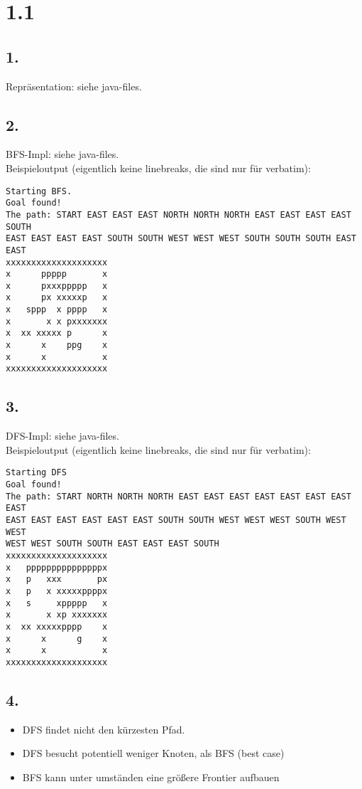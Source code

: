 \documentclass[a4paper,11pt,fleqn]{scrartcl}
\title{\titleinfo}
\author{\authorinfo}
\begin{document}
\maketitle

\section*{1.1}
\subsection*{1.}
Repräsentation: siehe java-files.
\subsection*{2.}
BFS-Impl: siehe java-files. \\
Beispieloutput (eigentlich keine linebreaks, die sind nur für verbatim):
\begin{verbatim}
Starting BFS.
Goal found!
The path: START EAST EAST EAST NORTH NORTH NORTH EAST EAST EAST EAST SOUTH 
EAST EAST EAST EAST SOUTH SOUTH WEST WEST WEST SOUTH SOUTH SOUTH EAST EAST
xxxxxxxxxxxxxxxxxxxx
x      ppppp       x
x      pxxxppppp   x
x      px xxxxxp   x
x   sppp  x pppp   x
x       x x pxxxxxxx
x  xx xxxxx p      x
x      x    ppg    x
x      x           x
xxxxxxxxxxxxxxxxxxxx
\end{verbatim}

\newpage

\subsection*{3.}
DFS-Impl: siehe java-files. \\
Beispieloutput (eigentlich keine linebreaks, die sind nur für verbatim):
\begin{verbatim}
Starting DFS
Goal found!
The path: START NORTH NORTH NORTH EAST EAST EAST EAST EAST EAST EAST EAST 
EAST EAST EAST EAST EAST EAST SOUTH SOUTH WEST WEST WEST SOUTH WEST WEST 
WEST WEST SOUTH SOUTH EAST EAST EAST SOUTH
xxxxxxxxxxxxxxxxxxxx
x   pppppppppppppppx
x   p   xxx       px
x   p   x xxxxxppppx
x   s     xppppp   x
x       x xp xxxxxxx
x  xx xxxxxpppp    x
x      x      g    x
x      x           x
xxxxxxxxxxxxxxxxxxxx
\end{verbatim}

\subsection*{4.}
\begin{itemize}
	\item DFS findet nicht den kürzesten Pfad.\\
    \item DFS besucht potentiell weniger Knoten, als BFS (best case)\\
    \item BFS kann unter umständen eine größere Frontier aufbauen
\end{itemize}
\end{document}
